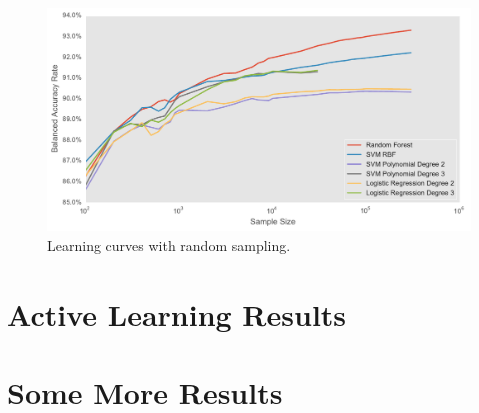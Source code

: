 \begin{figure}[tbp]
	\centering
	\includegraphics[width=\textwidth]{figures/learning_curves}
	\caption{Learning curves with random sampling.}
	\label{fig:learning}
\end{figure}



\section{Active Learning Results}
\label{sec:results1}

\section{Some More Results}
\label{sec:results2}

